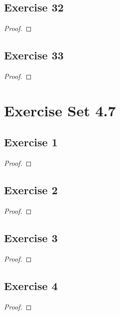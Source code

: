 \documentclass[14pt]{extarticle}
\begin{document}
\subsection{Exercise 32}

\begin{proof}

\end{proof}

\subsection{Exercise 33}

\begin{proof}

\end{proof}

\section{Exercise Set 4.7}

\subsection{Exercise 1}

\begin{proof}

\end{proof}

\subsection{Exercise 2}

\begin{proof}

\end{proof}

\subsection{Exercise 3}

\begin{proof}

\end{proof}

\subsection{Exercise 4}

\begin{proof}

\end{proof}
\end{document}

